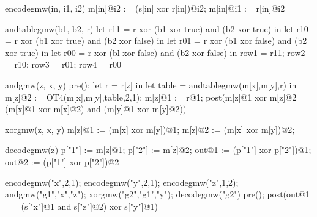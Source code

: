 \begin{verbatimtab}
    encodegmw(in, i1, i2) {
      m[in]@i2 := (s[in] xor r[in])@i2;
      m[in]@i1 := r[in]@i2
    }
    
    andtablegmw(b1, b2, r) {
      let r11 = r xor (b1 xor true) and (b2 xor true) in
      let r10 = r xor (b1 xor true) and (b2 xor false) in
      let r01 = r xor (b1 xor false) and (b2 xor true) in
      let r00 = r xor (bl xor false) and (b2 xor false) in
      { row1 = r11; row2 = r10; row3 = r01; row4 = r00 }
    }
    
    andgmw(z, x, y) {
      pre();
      let r = r[z] in
      let table = andtablegmw(m[x],m[y],r) in
      m[z]@2 := OT4(m[x],m[y],table,2,1);
      m[z]@1 := r@1;
      post(m[z]@1 xor m[z]@2 == (m[x]@1 xor m[x]@2) and (m[y]@1 xor m[y]@2))
    }
    
    xorgmw(z, x, y) {
      m[z]@1 := (m[x] xor m[y])@1; m[z]@2 := (m[x] xor m[y])@2;
    }
    
    decodegmw(z) {
      p["1"] := m[z]@1; p["2"] := m[z]@2;
      out@1 := (p["1"] xor p["2"])@1;
      out@2 := (p["1"] xor p["2"])@2
    }

    encodegmw("x",2,1);
    encodegmw("y",2,1);
    encodegmw("z",1,2);
    andgmw("g1","x","z");
    xorgmw("g2","g1","y");
    decodegmw("g2")
    pre();
    post(out@1 == (s["x"]@1 and s["z"]@2) xor s["y"]@1)
    
\end{verbatimtab}


